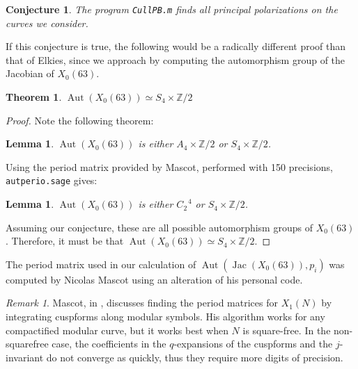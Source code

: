 \documentclass[12pt,reqno]{amsart}
\DeclareMathOperator{\Aut}{Aut}
\DeclareMathOperator{\Jac}{Jac}
\newcommand{\Z}{\mathbb{Z}}
\newtheorem*{thm*}{Theorem}
\newtheorem{lemma}[theorem]{Lemma}
\newtheorem*{lemma*}{Lemma}
\newtheorem*{conjecture*}{Conjecture}
\theoremstyle{definition}
\theoremstyle{remark}
\newtheorem*{remark}{Remark}
\begin{document}

\begin{conjecture*} \label{63conj} The program \texttt{CullPB.m} finds all principal polarizations on the curves we consider. \end{conjecture*}

If this conjecture is true, the following would be a radically different proof than that of Elkies, since we approach by computing the automorphism group of the Jacobian of $X_0(63)$. 

\begin{thm*} $\Aut(X_0(63)) \simeq S_4 \times \Z/2$ \end{thm*} 

\begin{proof} Note the following theorem:

\begin{lemma*} \cite{km} $\Aut(X_0(63))$ is either $A_4 \times \Z/2$ or $S_4 \times \Z/2$. 
\end{lemma*}

Using the period matrix provided by Mascot, performed with 150 precisions, \texttt{autperio.sage} gives:

\begin{lemma} $\Aut(X_0(63))$ is either $C_2^{\text{ }4}$ or $S_4 \times \Z/2$.
\end{lemma}

Assuming our conjecture, these are all possible automorphism groups of $X_0(63)$. Therefore, it must be that $\Aut(X_0(63)) \simeq S_4 \times \Z/2$. 
\end{proof} 

\vspace{+10pt} 
The period matrix used in our calculation of $\Aut(\Jac(X_0(63)), p_i)$ was computed by Nicolas Mascot using an alteration of his personal code.

\begin{remark} Mascot, in \cite{n}, discusses finding the period matrices for $X_1(N)$ by integrating cuspforms along modular symbols. His algorithm works for any compactified modular curve, but it works best when $N$ is square-free. In the non-squarefree case, the coefficients in the $q$-expansions of the cuspforms and the $j$-invariant do not converge as quickly, thus they require more digits of precision. \end{remark}
\end{document}
